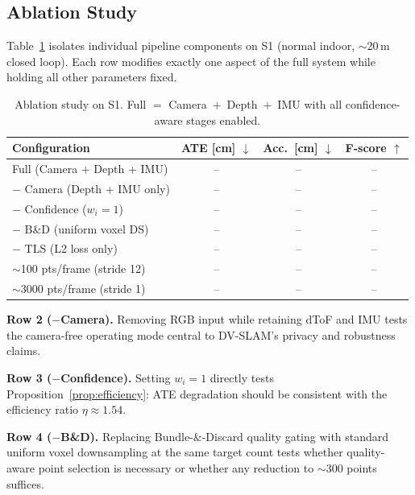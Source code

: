 \subsection{Ablation Study}
\label{sec:ablation}

Table~\ref{tab:ablation} isolates individual pipeline components on S1
(normal indoor, ${\sim}$20\,m closed loop).
Each row modifies exactly one aspect of the full system while holding all
other parameters fixed.

\begin{table}[t]
    \centering
    \caption{Ablation study on S1. Full $=$ Camera~+~Depth~+~IMU with all
    confidence-aware stages enabled.}
    \label{tab:ablation}
    \setlength{\tabcolsep}{4pt}
    \footnotesize
    \begin{tabular}{lccc}
        \toprule
        Configuration & ATE [cm] $\downarrow$ & Acc.\ [cm] $\downarrow$
                      & F-score $\uparrow$ \\
        \midrule
        Full (Camera + Depth + IMU)          & -- & -- & -- \\
        $-$ Camera (Depth + IMU only)        & -- & -- & -- \\
        $-$ Confidence ($w_i = 1$)           & -- & -- & -- \\
        $-$ B\&D (uniform voxel DS)          & -- & -- & -- \\
        $-$ TLS (L2 loss only)               & -- & -- & -- \\
        ${\sim}$100 pts/frame (stride 12)    & -- & -- & -- \\
        ${\sim}$3000 pts/frame (stride 1)    & -- & -- & -- \\
        \bottomrule
    \end{tabular}
\end{table}

\textbf{Row 2 ($-$Camera).}
Removing RGB input while retaining dToF and IMU tests the camera-free
operating mode central to DV-SLAM's privacy and robustness claims.

\textbf{Row 3 ($-$Confidence).}
Setting $w_i = 1$ directly tests Proposition~\ref{prop:efficiency}: ATE
degradation should be consistent with the efficiency ratio
$\eta \approx 1.54$.

\textbf{Row 4 ($-$B\&D).}
Replacing Bundle-\&-Discard quality gating with standard uniform voxel
downsampling at the same target count tests whether quality-aware point
selection is necessary or whether any reduction to ${\sim}$300 points
suffices.

